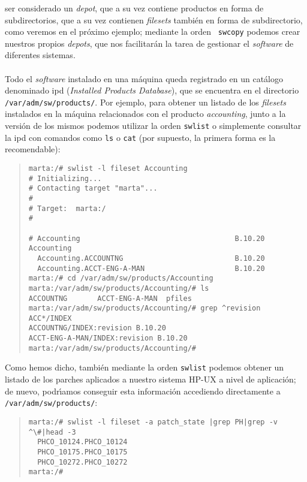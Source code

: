ser considerado un {\it depot}, que a su vez contiene productos en forma de 
subdirectorios, que a su vez contienen {\it filesets} tambi\'en en forma de
subdirectorio, como veremos en el pr\'oximo ejemplo; mediante la orden {\tt 
swcopy} podemos crear nuestros propios {\it depots}, que nos facilitar\'an la 
tarea de gestionar el {\it software} de diferentes sistemas.\\
\\Todo el {\it software} instalado en una m\'aquina queda registrado en 
un cat\'alogo denominado {\sc ipd} ({\it Installed Products Database}), que se 
encuentra en el directorio {\tt /var/adm/sw/products/}. Por ejemplo, para 
obtener un listado de los {\it filesets} instalados en la m\'aquina 
relacionados con el producto {\it accounting}, junto a la versi\'on de los 
mismos podemos utilizar la orden {\tt swlist} o simplemente consultar la {\sc 
ipd} con comandos como {\tt ls} o {\tt cat} (por supuesto, la primera forma es 
la recomendable):
\begin{quote}
\begin{verbatim}
marta:/# swlist -l fileset Accounting
# Initializing...
# Contacting target "marta"...
#
# Target:  marta:/
#

# Accounting                                    B.10.20        Accounting     
  Accounting.ACCOUNTNG                          B.10.20                       
  Accounting.ACCT-ENG-A-MAN                     B.10.20                       
marta:/# cd /var/adm/sw/products/Accounting
marta:/var/adm/sw/products/Accounting/# ls
ACCOUNTNG       ACCT-ENG-A-MAN  pfiles
marta:/var/adm/sw/products/Accounting/# grep ^revision ACC*/INDEX
ACCOUNTNG/INDEX:revision B.10.20
ACCT-ENG-A-MAN/INDEX:revision B.10.20
marta:/var/adm/sw/products/Accounting/# 
\end{verbatim}
\end{quote}
Como hemos dicho, tambi\'en mediante la orden {\tt swlist} podemos obtener un 
listado de los parches aplicados a nuestro sistema HP-UX a nivel de 
aplicaci\'on; de nuevo, podr\'{\i}amos conseguir esta informaci\'on accediendo
directamente a {\tt /var/adm/sw/products/}:
\begin{quote}
\begin{verbatim}
marta:/# swlist -l fileset -a patch_state |grep PH|grep -v ^\#|head -3
  PHCO_10124.PHCO_10124                 
  PHCO_10175.PHCO_10175                 
  PHCO_10272.PHCO_10272                 
marta:/#
\end{verbatim}
\end{quote}
